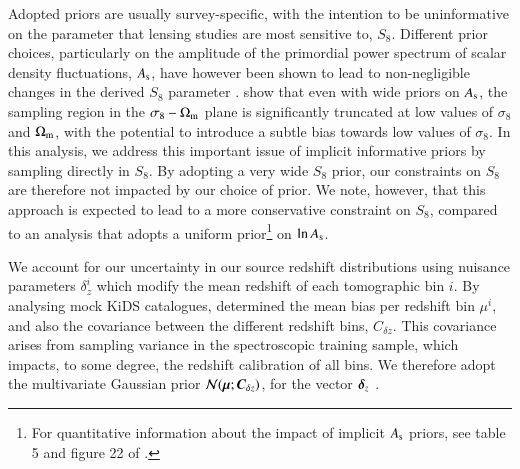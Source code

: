 Adopted priors are usually survey-specific, with the intention to be uninformative on the parameter that lensing studies are most sensitive to, $S_8$.  
Different prior choices, particularly on the amplitude of the primordial power spectrum of scalar density fluctuations, $A_{\rm s}$, have however been shown to lead to non-negligible changes in the derived $S_8$ parameter \citep{chang/etal:2019, joudaki/etal:2020, asgari/etal:2020_KD}. 
\citet{joachimi/etal:inprep} show that even with wide priors on $A_{\rm s}$,  the sampling region in the $\sigma_8 - \Omega_{\rm m}$ plane is significantly truncated at low values of $\sigma_8$ and $\Omega_{\rm m}$, with the potential to introduce a subtle bias towards low values of $\sigma_8$.   In this analysis, we address this important issue of implicit informative priors by sampling directly in $S_8$.   By adopting a very wide $S_8$ prior, our constraints on $S_8$ are therefore not impacted by our choice of prior.  We note, however, that this approach is expected to lead to a more conservative constraint on $S_8$, compared to an analysis that adopts a uniform prior\footnote{For quantitative information about the impact of implicit $A_{\rm s}$ priors, see table 5 and figure 22 of \citet{joachimi/etal:inprep}.} on $\ln A_{\rm s}$.

We account for our uncertainty in our source redshift distributions using nuisance parameters $\delta_z^i$ which modify the mean redshift of each tomographic bin $i$.   By analysing mock KiDS catalogues, \citet{wright/etal:2020} determined the mean bias per redshift bin $\mu^i$, and also the covariance between the different redshift bins, $C_{\delta z}$.   This covariance arises from sampling variance in the spectroscopic training sample, which impacts, to some degree, the redshift calibration of all bins.    We therefore adopt the multivariate Gaussian prior ${\cal N}(\mbox{\boldmath $\mu$};\mbox{\boldmath $C$}_{\delta z})$, for the vector $\mbox{\boldmath $\delta$}_z$ \citep[see section 3 of,][for details]{hildebrandt/etal:inprep}. 

